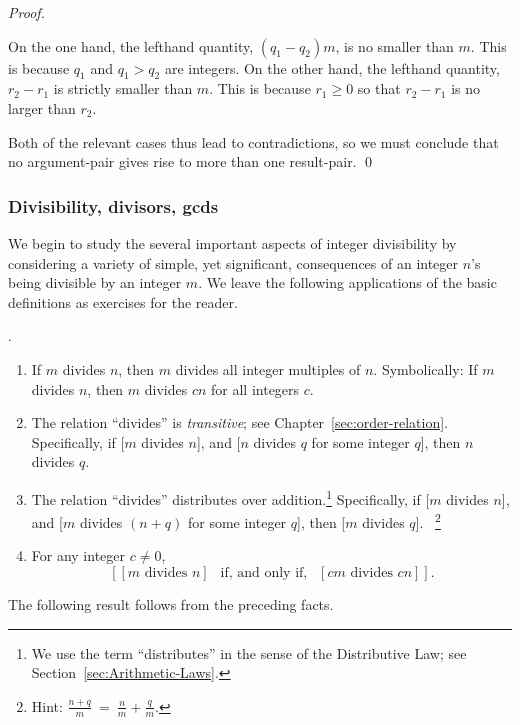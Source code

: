 \begin{proof}
\begin{itemize}
On the one hand, the lefthand quantity, $(q_1 - q_2) m$, is no smaller
than $m$.  This is because $q_1$ and $q_1 > q_2$ are integers.  On the
other hand, the lefthand quantity, $r_2 - r_1$ is strictly smaller
than $m$.  This is because $r_1 \geq 0$ so that $r_2 - r_1$ is no
larger than $r_2$.
\end{itemize}
Both of the relevant cases thus lead to contradictions, so we must
conclude that no argument-pair gives rise to more than one
result-pair.  \qed
\end{proof}


\subsubsection{Divisibility, divisors, {\sc gcd}s}
\label{sec:divisibility+GCD}

We begin to study the several important aspects of integer
divisibility by considering a variety of simple, yet significant,
consequences of an integer $n$'s being divisible by an integer $m$.
We leave the following applications of the basic definitions as
exercises for the reader.

\begin{prop}.
\label{thm:basic-divisibility}
\begin{enumerate}
\item
If $m$ divides $n$, then $m$ divides all integer multiples of $n$.
Symbolically: If $m$ divides $n$, then $m$ divides $cn$ for all
integers $c$.
\item
The relation ``divides'' is {\em transitive}; see
Chapter~\ref{sec:order-relation}.  Specifically, if [$m$ divides $n$],
and [$n$ divides $q$ for some integer $q$], then $n$ divides $q$.
\item
The relation ``divides'' distributes over addition.\footnote{We use
  the term ``distributes'' in the sense of the Distributive Law; see
  Section~\ref{sec:Arithmetic-Laws}.}  Specifically, if [$m$ divides
  $n$], and [$m$ divides $(n+q)$ for some integer $q$], then [$m$
  divides $q$]. \ \footnote{Hint: $\displaystyle \frac{n+q}{m} \ =
  \ \frac{n}{m} + \frac{q}{m}$.}
\item 
For any integer $c \neq 0$,
\[ \left[[m \mbox{ divides } n] \ \ \mbox{ if, and only if, } \ \ [cm
    \mbox{ divides } cn] \right]. \]
\end{enumerate}
\end{prop}

The following result follows from the preceding facts.

